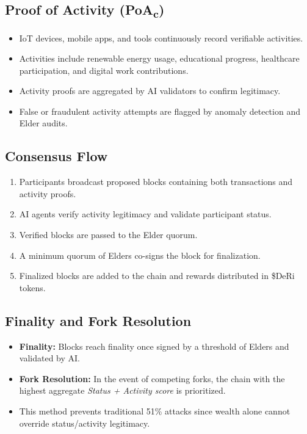 \documentclass[11pt,a4paper]{article}
\begin{document}
\subsection{Proof of Activity (PoA\textsubscript{c})}
\begin{itemize}
    \item IoT devices, mobile apps, and tools continuously record verifiable activities.
    \item Activities include renewable energy usage, educational progress, healthcare participation, and digital work contributions.
    \item Activity proofs are aggregated by AI validators to confirm legitimacy.
    \item False or fraudulent activity attempts are flagged by anomaly detection and Elder audits.
\end{itemize}

\subsection{Consensus Flow}
\begin{enumerate}
    \item Participants broadcast proposed blocks containing both transactions and activity proofs.
    \item AI agents verify activity legitimacy and validate participant status.
    \item Verified blocks are passed to the Elder quorum.
    \item A minimum quorum of Elders co-signs the block for finalization.
    \item Finalized blocks are added to the chain and rewards distributed in \$DeRi tokens.
\end{enumerate}

\subsection{Finality and Fork Resolution}
\begin{itemize}
    \item \textbf{Finality:} Blocks reach finality once signed by a threshold of Elders and validated by AI.
    \item \textbf{Fork Resolution:} In the event of competing forks, the chain with the highest aggregate \textit{Status + Activity score} is prioritized.
    \item This method prevents traditional 51\% attacks since wealth alone cannot override status/activity legitimacy.
\end{itemize}
\end{document}
